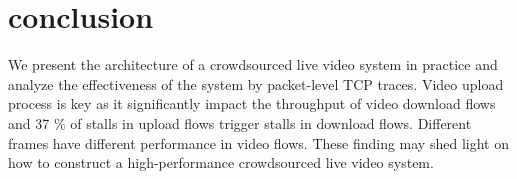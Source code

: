 
\section{conclusion}
\label{sec:conclusion}
 
We present the architecture of a crowdsourced live video system in practice and analyze the effectiveness of the system by packet-level TCP traces. Video upload process is key as it significantly impact the throughput of video download flows and 37 \% of stalls in upload flows trigger stalls in download flows. Different frames have different performance in video flows. These finding may shed light on how to construct a high-performance crowdsourced live video system. 